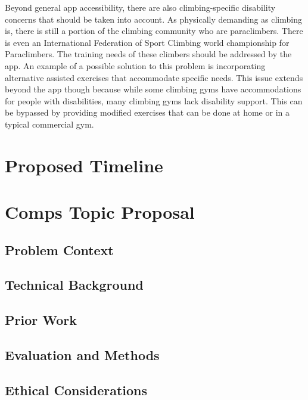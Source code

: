 \documentclass[10pt,twocolumn]{article}
\begin{document}
    Beyond general app accessibility, there are also climbing-specific disability concerns that should be taken into account. As physically demanding as climbing is, there is still a portion of the climbing community who are paraclimbers. There is even an International Federation of Sport Climbing world championship for Paraclimbers. \cite{rcc_climbing_nodate} The training needs of these climbers should be addressed by the app. An example of a possible solution to this problem is incorporating alternative assisted exercises that accommodate specific needs. This issue extends beyond the app though because while some climbing gyms have accommodations for people with disabilities, many climbing gyms lack disability support. This can be bypassed by providing modified exercises that can be done at home or in a typical commercial gym. \cite{rcc_climbing_nodate}



    
\section{Proposed Timeline}
    
\section{Comps Topic Proposal}

\subsection{Problem Context}

\subsection{Technical Background}

\subsection{Prior Work}	

\subsection{Evaluation and Methods}

\subsection{Ethical Considerations}



\printbibliography
\end{document}
